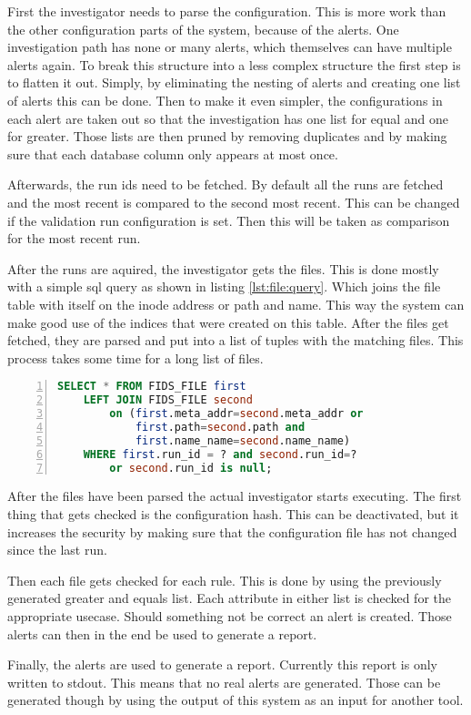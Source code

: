 First the investigator needs to parse the configuration. This is more work than the other configuration parts of the system, because of the alerts. One investigation path has none or many alerts, which themselves can have multiple alerts again. To break this structure into a less complex structure the first step is to flatten it out. Simply, by eliminating the nesting of alerts and creating one list of alerts this can be done. Then to make it even simpler, the configurations in each alert are taken out so that the investigation has one list for equal and one for greater. Those lists are then pruned by removing duplicates and by making sure that each database column only appears at most once. 

Afterwards, the run ids need to be fetched. By default all the runs are fetched and the most recent is compared to the second most recent. This can be changed if the validation run configuration is set. Then this will be taken as comparison for the most recent run.

After the runs are aquired, the investigator gets the files. This is done mostly with a simple sql query as shown in listing \ref{lst:file:query}. Which joins the file table with itself on the inode address or path and name. This way the system can make good use of the indices that were created on this table. After the files get fetched, they are parsed and put into a list of tuples with the matching files. This process takes some time for a long list of files. 

\begin{lstlisting}[language=sql, numbers=left, caption=SQL Querry for files, label=lst:file:query]
SELECT * FROM FIDS_FILE first 
	LEFT JOIN FIDS_FILE second 
		on (first.meta_addr=second.meta_addr or 
			first.path=second.path and 
			first.name_name=second.name_name)
	WHERE first.run_id = ? and second.run_id=? 
		or second.run_id is null;
\end{lstlisting}

After the files have been parsed the actual investigator starts executing. The first thing that gets checked is the configuration hash. This can be deactivated, but it increases the security by making sure that the configuration file has not changed since the last run.

Then each file gets checked for each rule. This is done by using the previously generated greater and equals list. Each attribute in either list is checked for the appropriate usecase. Should something not be correct an alert is created. Those alerts can then in the end be used to generate a report. 

Finally, the alerts are used to generate a report. Currently this report is only written to stdout. This means that no real alerts are generated. Those can be generated though by using the output of this system as an input for another tool.
